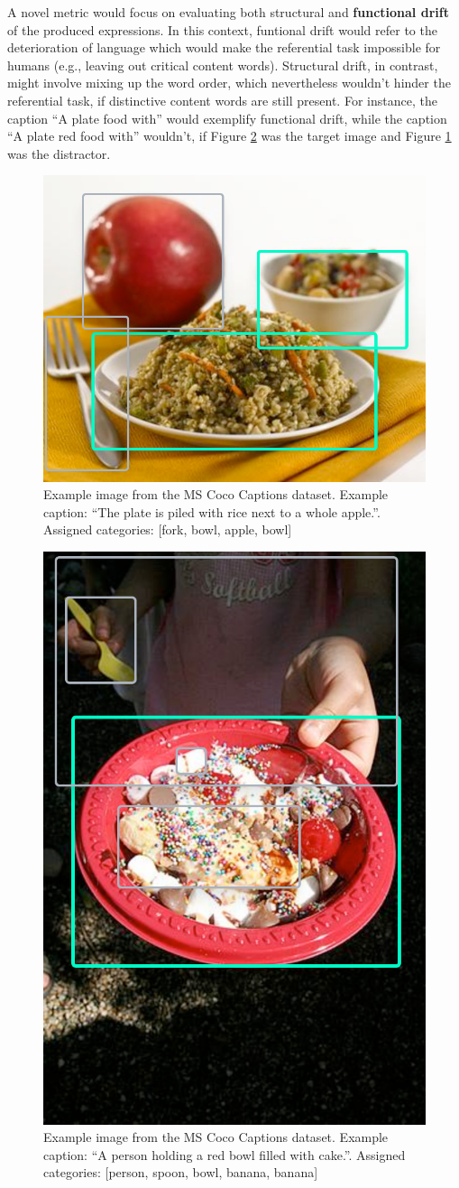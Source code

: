 \documentclass[11pt,letterpaper]{article}
\begin{document}
\begin{enumerate}
A novel metric would focus on evaluating both structural and \textbf{functional drift} of the produced expressions. In this context, funtional drift would refer to the deterioration of language which would make the referential task impossible for humans (e.g., leaving out critical content words). Structural drift, in contrast, might involve mixing up the word order, which nevertheless wouldn't hinder the referential task, if distinctive content words are still present. For instance, the caption ``A plate food with'' would exemplify functional drift, while the caption ``A plate red food with'' wouldn't, if Figure \ref{fig:screenshot003} was the target image and Figure \ref{fig:screenshot002} was the distractor. 

\begin{figure}
	\centering
	\includegraphics[width=0.5\linewidth]{images/screenshot002.png}
	\caption{Example image from the MS Coco Captions dataset. Example caption: ``The plate is piled with rice next to a whole apple.''. Assigned categories: [fork, bowl, apple, bowl]}
	\label{fig:screenshot002}
\end{figure}
\begin{figure}
	\centering
	\includegraphics[width=0.3\linewidth]{images/screenshot003.png}
	\caption{Example image from the MS Coco Captions dataset. Example caption: ``A person holding a red bowl filled with cake.''. Assigned categories: [person, spoon, bowl, banana, banana]}
	\label{fig:screenshot003}
\end{figure}


\end{enumerate}
\end{document}
